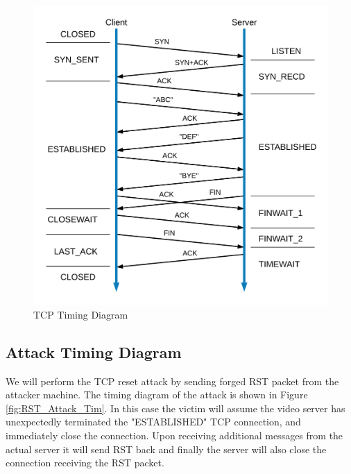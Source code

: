 \documentclass[14pt]{extarticle}
\begin{document}
        \begin{figure}[!t]
        	\centering
        	\includegraphics[width=.95\textwidth]{Pictures/Design/TCP_Timing_Diagram.png}
        	\caption{TCP Timing Diagram}
        	\label{fig:TCP_Tim}
        \end{figure}
    
    \newpage    
    \subsection{Attack Timing Diagram}
    
    We will perform the TCP reset attack by sending forged RST packet from the attacker machine. The timing diagram of the attack is shown in Figure \ref{fig:RST_Attack_Tim}. In this case the victim will assume the video server has unexpectedly terminated the "ESTABLISHED" TCP connection, and immediately close the connection. Upon receiving additional messages from the actual server it will send RST back and finally the server will also close the connection receiving the RST packet. \\ 
    
\end{document}
